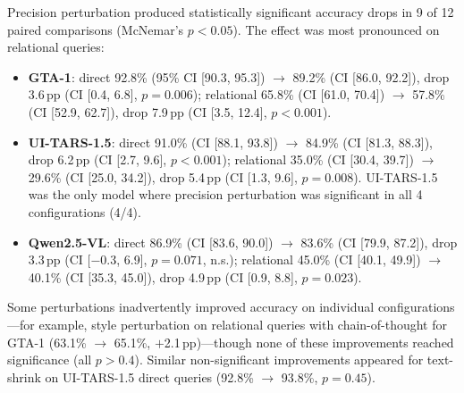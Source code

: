 

Precision perturbation produced statistically significant accuracy drops
in 9 of 12 paired comparisons (McNemar's $p < 0.05$). The effect was
most pronounced on relational queries:

\begin{itemize}[nosep]
  \item \textbf{GTA-1}: direct 92.8\% (95\% CI [90.3, 95.3])
    $\to$ 89.2\% (CI [86.0, 92.2]), drop 3.6\,pp
    (CI [0.4, 6.8], $p = 0.006$);
    relational 65.8\% (CI [61.0, 70.4])
    $\to$ 57.8\% (CI [52.9, 62.7]), drop 7.9\,pp
    (CI [3.5, 12.4], $p < 0.001$).
  \item \textbf{UI-TARS-1.5}: direct 91.0\% (CI [88.1, 93.8])
    $\to$ 84.9\% (CI [81.3, 88.3]), drop 6.2\,pp
    (CI [2.7, 9.6], $p < 0.001$);
    relational 35.0\% (CI [30.4, 39.7])
    $\to$ 29.6\% (CI [25.0, 34.2]), drop 5.4\,pp
    (CI [1.3, 9.6], $p = 0.008$).
    UI-TARS-1.5 was the only model where precision perturbation was
    significant in all 4 configurations (4/4).
  \item \textbf{Qwen2.5-VL}: direct 86.9\% (CI [83.6, 90.0])
    $\to$ 83.6\% (CI [79.9, 87.2]), drop 3.3\,pp
    (CI [$-$0.3, 6.9], $p = 0.071$, n.s.);
    relational 45.0\% (CI [40.1, 49.9])
    $\to$ 40.1\% (CI [35.3, 45.0]), drop 4.9\,pp
    (CI [0.9, 8.8], $p = 0.023$).
\end{itemize}


Some perturbations inadvertently improved accuracy on individual
configurations---for example, style perturbation on relational queries
with chain-of-thought for GTA-1 (63.1\% $\to$ 65.1\%, $+$2.1\,pp)---though
none of these improvements reached significance (all $p > 0.4$).
Similar non-significant improvements appeared for text-shrink on
UI-TARS-1.5 direct queries (92.8\% $\to$ 93.8\%, $p = 0.45$).




